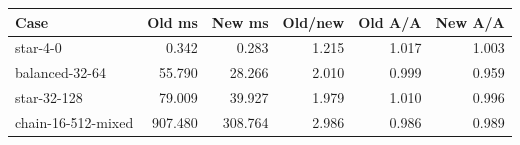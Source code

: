 \begin{center}\small
\begin{tabular}{lrrrrr}
\toprule
Case & Old ms & New ms & Old/new & Old A/A & New A/A \\
\midrule
star-4-0 & 0.342 & 0.283 & 1.215 & 1.017 & 1.003 \\
balanced-32-64 & 55.790 & 28.266 & 2.010 & 0.999 & 0.959 \\
star-32-128 & 79.009 & 39.927 & 1.979 & 1.010 & 0.996 \\
chain-16-512-mixed & 907.480 & 308.764 & 2.986 & 0.986 & 0.989 \\
\bottomrule
\end{tabular}
\end{center}
